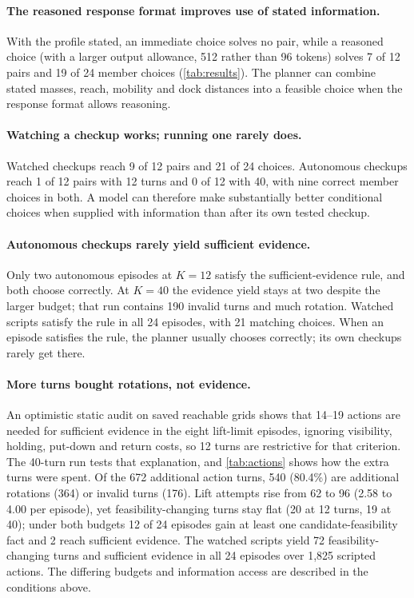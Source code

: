 \documentclass{article}
\begin{document}
\paragraph{The reasoned response format improves use of stated information.} With the profile stated, an immediate choice solves no pair, while a reasoned choice (with a larger output allowance, 512 rather than 96 tokens) solves 7 of 12 pairs and 19 of 24 member choices (\cref{tab:results}). The planner can combine stated masses, reach, mobility and dock distances into a feasible choice when the response format allows reasoning.

\paragraph{Watching a checkup works; running one rarely does.} Watched checkups reach 9 of 12 pairs and 21 of 24 choices. Autonomous checkups reach 1 of 12 pairs with 12 turns and 0 of 12 with 40, with nine correct member choices in both. A model can therefore make substantially better conditional choices when supplied with information than after its own tested checkup.

\paragraph{Autonomous checkups rarely yield sufficient evidence.} Only two autonomous episodes at $K=12$ satisfy the sufficient-evidence rule, and both choose correctly. At $K=40$ the evidence yield stays at two despite the larger budget; that run contains 190 invalid turns and much rotation. Watched scripts satisfy the rule in all 24 episodes, with 21 matching choices. When an episode satisfies the rule, the planner usually chooses correctly; its own checkups rarely get there.

\paragraph{More turns bought rotations, not evidence.} An optimistic static audit on saved reachable grids shows that 14--19 actions are needed for sufficient evidence in the eight lift-limit episodes, ignoring visibility, holding, put-down and return costs, so 12 turns are restrictive for that criterion. The 40-turn run tests that explanation, and \cref{tab:actions} shows how the extra turns were spent. Of the 672 additional action turns, 540 (80.4\%) are additional rotations (364) or invalid turns (176). Lift attempts rise from 62 to 96 (2.58 to 4.00 per episode), yet feasibility-changing turns stay flat (20 at 12 turns, 19 at 40); under both budgets 12 of 24 episodes gain at least one candidate-feasibility fact and 2 reach sufficient evidence. The watched scripts yield 72 feasibility-changing turns and sufficient evidence in all 24 episodes over 1,825 scripted actions. The differing budgets and information access are described in the conditions above.
\end{document}
